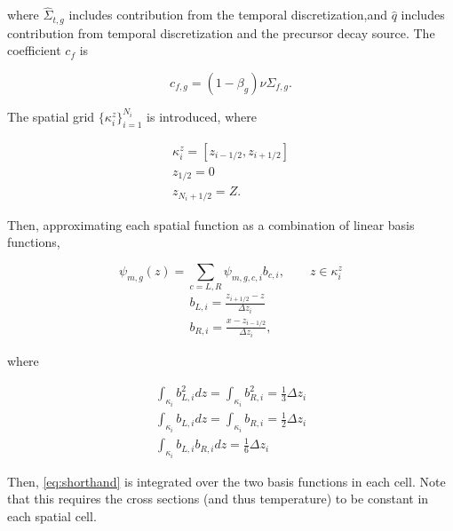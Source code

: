 \documentclass{proposal}
\begin{document}
where $\hat{\Sigma}_{t, g}$ includes contribution from the temporal discretization,and $\hat{q}$ includes contribution from temporal discretization and the precursor decay source. The coefficient $c_f$ is

\begin{equation}
    c_{f, g} = (1 - \beta_g)\nu\Sigma_{f, g}.
\end{equation}

The spatial grid $\{ \kappa_i^z \}_{i=1}^{N_i}$ is introduced, where

\begin{gather}
    \kappa_i^z = [z_{i-1/2}, z_{i+1/2}]\\
    z_{1/2} = 0\\
    z_{N_i +1/2} = Z.
\end{gather}

Then, approximating each spatial function as a combination of linear basis functions,

\begin{equation}
    \psi_{m, g}(z) = \sum_{c = L, R}\psi_{m, g, c, i}b_{c, i}, \qquad z \in \kappa_i^z
\end{equation}
\begin{gather}
    b_{L, i} = \frac{z_{i+1/2} - z}{\Delta z_i}\\
    b_{R, i} = \frac{x - z_{i-1/2}}{\Delta z_i},
\end{gather}

where

\begin{gather}
    \int_{\kappa_i} b_{L, i}^2 dz = \int_{\kappa_i} b_{R, i}^2 = \frac{1}{3}\Delta z_i\\
    \int_{\kappa_i} b_{L, i} dz = \int_{\kappa_i} b_{R, i} = \frac{1}{2}\Delta z_i\\
    \int_{\kappa_i} b_{L, i}b_{R, i} dz = \frac{1}{6}\Delta z_i
\end{gather}

Then, \cref{eq:shorthand} is integrated over the two basis functions in each cell. Note that this requires the cross sections (and thus temperature) to be constant in each spatial cell.
\end{document}
